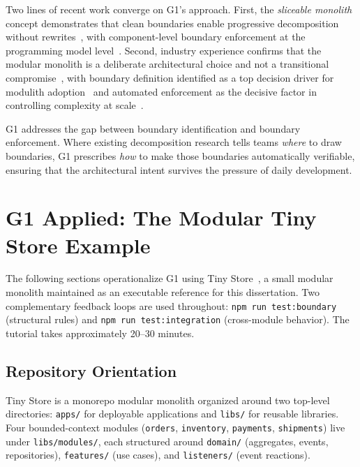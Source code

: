 Two lines of recent work converge on G1's approach. First, the \textit{sliceable monolith} concept demonstrates that clean boundaries enable progressive decomposition without rewrites~\cite{montesi2021sliceable}, with component-level boundary enforcement at the programming model level~\cite{ghemawat2023towards}. Second, industry experience confirms that the modular monolith is a deliberate architectural choice and not a transitional compromise~\cite{su2024modular, gravanis2021dont}, with boundary definition identified as a top decision driver for modulith adoption~\cite{prakash2024systematic} and automated enforcement as the decisive factor in controlling complexity at scale~\cite{shopify2020monolith, jovanovic2024rewriting}.

G1 addresses the gap between boundary identification and boundary enforcement. Where existing decomposition research tells teams \emph{where} to draw boundaries, G1 prescribes \emph{how} to make those boundaries automatically verifiable, ensuring that the architectural intent survives the pressure of daily development.

\section*{G1 Applied: The Modular Tiny Store Example}
\label{sec:g1-demo-tiny-store}

The following sections operationalize G1 using Tiny Store~\cite{tinystore2026}, a small modular monolith maintained as an executable reference for this dissertation. Two complementary feedback loops are used throughout: \texttt{npm run test:boundary} (structural rules) and \texttt{npm run test:integration} (cross-module behavior). The tutorial takes approximately 20--30 minutes.

\subsection*{Repository Orientation}

Tiny Store is a monorepo modular monolith organized around two top-level directories: \texttt{apps/} for deployable applications and \texttt{libs/} for reusable libraries. Four bounded-context modules (\texttt{orders}, \texttt{inventory}, \texttt{payments}, \texttt{shipments}) live under \texttt{libs/modules/}, each structured around \texttt{domain/} (aggregates, events, repositories), \texttt{features/} (use cases), and \texttt{listeners/} (event reactions).

